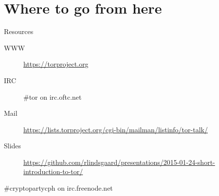 \documentclass{beamer}
\begin{document}
\section{Where to go from here}
	\begin{frame}{Resources}
		\begin{description}
			\item[WWW] \url{https://torproject.org}
			\item[IRC] \#tor on irc.oftc.net
			\item[Mail] \url{https://lists.torproject.org/cgi-bin/mailman/listinfo/tor-talk/}
			\item[Slides] \url{https://github.com/rlindsgaard/presentations/2015-01-24-short-introduction-to-tor/}
		\end{description}

		\begin{center}
			\#cryptopartycph on irc.freenode.net
		\end{center}
	\end{frame}
\end{document}
